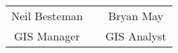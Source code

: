 \documentclass[landscape]{article}
\begin{document}
\centering

\begin{tabular}{ccc}
\cline{1-1}
\cline{3-3}
\\
Neil Besteman  & &  Bryan May \\
GIS Manager & & GIS Analyst \\

\end{tabular}
\end{document}
